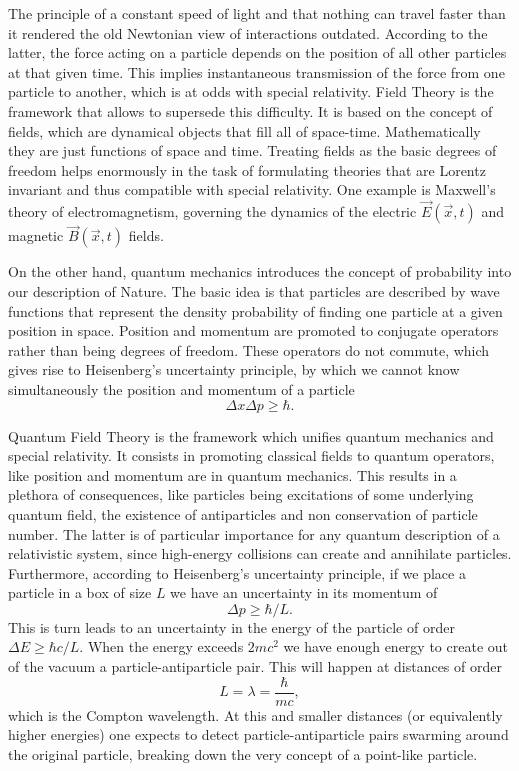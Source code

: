 The principle of a constant speed of light and that nothing can travel faster than it rendered the old Newtonian view of interactions outdated. According to the latter, the force acting on a particle depends on the position of all other particles at that given time. This implies instantaneous transmission of the force from one particle to another, which is at odds with special relativity. Field Theory is the framework that allows to supersede this difficulty. It is based on the concept of fields, which are dynamical objects that fill all of space-time. Mathematically they are just functions of space and time. Treating fields as the basic degrees of freedom helps enormously in the task of formulating theories that are Lorentz invariant and thus compatible with special relativity. One example is Maxwell's theory of electromagnetism, governing the dynamics of the electric $\vec{E}(\vec{x},t)$ and magnetic $\vec{B}(\vec{x},t)$ fields.

On the other hand, quantum mechanics introduces the concept of probability into our description of Nature. The basic idea is that particles are described by wave functions that represent the density probability of finding one particle at a given position in space. Position and momentum are promoted to conjugate operators rather than being degrees of freedom. These operators do not commute, which gives rise to Heisenberg's uncertainty principle, by which we cannot know simultaneously the position and momentum of a particle
\begin{equation*}
\Delta x\Delta p\geq\hbar.
\end{equation*} 

Quantum Field Theory is the framework which unifies quantum mechanics and special relativity. It consists in promoting classical fields to quantum operators, like position and momentum are in quantum mechanics. This results in a plethora of consequences, like particles being excitations of some underlying quantum field, the existence of antiparticles and non conservation of particle number. The latter is of particular importance for any quantum description of a relativistic system, since high-energy collisions can create and annihilate particles. Furthermore, according to Heisenberg's uncertainty principle, if we place a particle in a box of size $L$ we have an uncertainty in its momentum of
\begin{equation*}
\Delta p\geq\hbar/L.
\end{equation*}
This is turn leads to an uncertainty in the energy of the particle of order $\Delta E\geq\hbar c/L$. When the energy exceeds $2mc^2$ we have enough energy to create out of the vacuum a particle-antiparticle pair. This will happen at distances of order 
\begin{equation*}
L=\lambda=\frac{\hbar}{mc},
\end{equation*}
which is the Compton wavelength. At this and smaller distances (or equivalently higher energies) one expects to detect particle-antiparticle pairs swarming around the original particle, breaking down the very concept of a point-like particle. 

